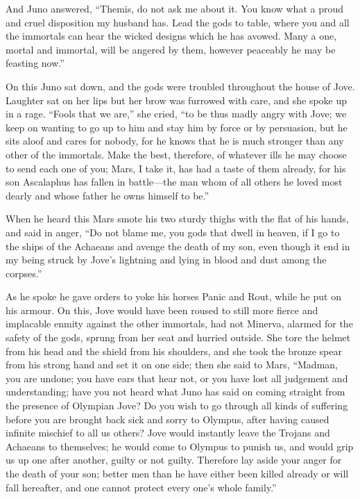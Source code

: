 And Juno answered, “Themis, do not ask me about it. You know what a proud
and cruel disposition my husband has. Lead the gods to table, where you
and all the immortals can hear the wicked designs which he has avowed.
Many a one, mortal and immortal, will be angered by them, however
peaceably he may be feasting now.”

On this Juno sat down, and the gods were troubled throughout the house of
Jove. Laughter sat on her lips but her brow was furrowed with care, and
she spoke up in a rage. “Fools that we are,” she cried, “to be thus madly
angry with Jove; we keep on wanting to go up to him and stay him by force
or by persuasion, but he sits aloof and cares for nobody, for he knows
that he is much stronger than any other of the immortals. Make the best,
therefore, of whatever ills he may choose to send each one of you; Mars, I
take it, has had a taste of them already, for his son Ascalaphus has
fallen in battle—the man whom of all others he loved most dearly and
whose father he owns himself to be.”

When he heard this Mars smote his two sturdy thighs with the flat of his
hands, and said in anger, “Do not blame me, you gods that dwell in heaven,
if I go to the ships of the Achaeans and avenge the death of my son, even
though it end in my being struck by Jove’s lightning and lying in blood
and dust among the corpses.”

As he spoke he gave orders to yoke his horses Panic and Rout, while he put
on his armour. On this, Jove would have been roused to still more fierce
and implacable enmity against the other immortals, had not Minerva,
alarmed for the safety of the gods, sprung from her seat and hurried
outside. She tore the helmet from his head and the shield from his
shoulders, and she took the bronze spear from his strong hand and set it
on one side; then she said to Mars, “Madman, you are undone; you have ears
that hear not, or you have lost all judgement and understanding; have you
not heard what Juno has said on coming straight from the presence of
Olympian Jove? Do you wish to go through all kinds of suffering before you
are brought back sick and sorry to Olympus, after having caused infinite
mischief to all us others? Jove would instantly leave the Trojans and
Achaeans to themselves; he would come to Olympus to punish us, and would
grip us up one after another, guilty or not guilty. Therefore lay aside
your anger for the death of your son; better men than he have either been
killed already or will fall hereafter, and one cannot protect every one’s
whole family.”


